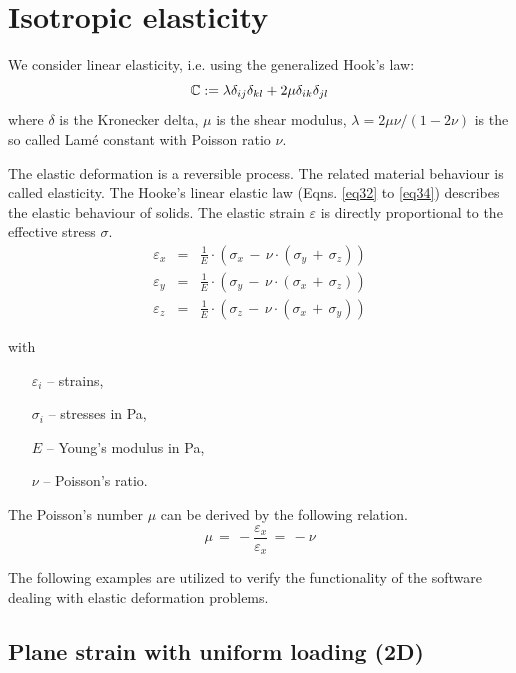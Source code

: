 \section{Isotropic elasticity}

We consider linear elasticity, i.e. using the generalized Hook's law:
\begin{equation}
 \mathbb C: = \lambda \delta_{ij} \delta_{kl}+2\mu\delta_{ik} \delta_{jl}
  \label{eq:hook}
\end{equation}
where $\delta$ is the Kronecker delta, $\mu$ is the shear modulus,  $\lambda=2\mu\nu/(1-2\nu)$ is the so called
 Lam\'e constant with Poisson ratio $\nu$.
 
The elastic deformation is a reversible process. The related material behaviour is called elasticity. The Hooke's linear elastic law (Eqns. \ref{eq32} to \ref{eq34}) describes the elastic behaviour of solids. The elastic strain $\varepsilon$ is directly proportional to the effective stress $\sigma$.
\begin{eqnarray}
\varepsilon_x & = & \frac{1}{E}\cdot
\left(
\sigma_x\,-\,\nu\cdot
\left(
\sigma_y\,+\,\sigma_z
\right)
\right)
\label{eq32} \\[1.5ex]
\varepsilon_y & = & \frac{1}{E}\cdot
\left(
\sigma_y\,-\,\nu\cdot
\left(
\sigma_x\,+\,\sigma_z
\right)
\right)
\label{eq33} \\[1.5ex]
\varepsilon_z & = & \frac{1}{E}\cdot
\left(
\sigma_z\,-\,\nu\cdot
\left(
\sigma_x\,+\,\sigma_y
\right)
\right)
\label{eq34}
\end{eqnarray}

{\small
with
\begin{itemize}
\item[$\varepsilon_i$] -- strains,
\item[$\sigma_i$] -- stresses in Pa,
\item[$E$] -- Young's modulus in Pa,
\item[$\nu$] -- Poisson's ratio.
\end{itemize}
}
The Poisson's number $\mu$ can be derived by the following relation.
\begin{displaymath}
\mu\,=\,-\frac{\varepsilon_x}{\varepsilon_x}\,=\,-\nu
\end{displaymath}


 The following examples are utilized to verify
 the functionality of the software dealing with elastic deformation problems.

\subsection{Plane strain with uniform loading (2D)}
